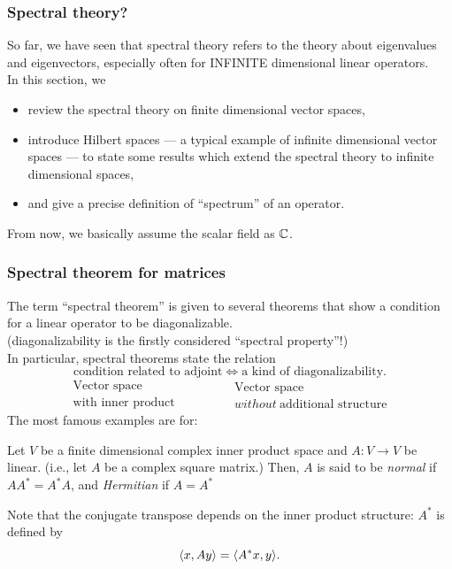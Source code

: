 \documentclass[10pt]{beamer}
\begin{document}
\begin{frame}
\frametitle{Spectral theory?}
  So far, we have seen that spectral theory refers to the theory about eigenvalues and eigenvectors, \pause especially often for INFINITE dimensional linear operators.\\
  \pause In this section, we
  \begin{itemize}
    \item review the spectral theory on finite dimensional vector spaces,
    \item introduce Hilbert spaces --- a typical example of infinite dimensional vector spaces --- to state some results which extend the spectral theory to infinite dimensional spaces,
    \item and give a precise definition of ``spectrum'' of an operator.
  \end{itemize}
  \pause From now, we basically assume the scalar field as $\mathbb{C}$.
\end{frame}

\begin{frame}
\frametitle{Spectral theorem for matrices}
  The term ``spectral theorem'' is given to several theorems that show a condition for a linear operator to be diagonalizable.\\
  (diagonalizability is the firstly considered ``spectral property''!)\\
  \pause In particular, spectral theorems state the relation
  \[\text{condition related to adjoint} \iff \text{a kind of diagonalizability}.\]
  \pause \vspace{-1em}
  \[\begin{array}{c}\text{Vector space}\\\text{with inner product}\end{array}\hspace{4em}\begin{array}{c}\text{Vector space}\\without\ \text{additional structure}\end{array}\]
  \pause The most famous examples are for:
  \begin{defn}
    Let $V$ be a finite dimensional complex inner product space and $A:V\to V$ be linear.
    (i.e., let $A$ be a complex square matrix.)
    Then, $A$ is said to be \emph{normal} if $AA^*=A^*A$, and \emph{Hermitian} if $A=A^*$
  \end{defn}
  \pause Note that the conjugate transpose depends on the inner product structure: $A^*$ is defined by
  \[\langle x,Ay\rangle=\langle A^*x,y\rangle.\]
\end{frame}
\end{document}

